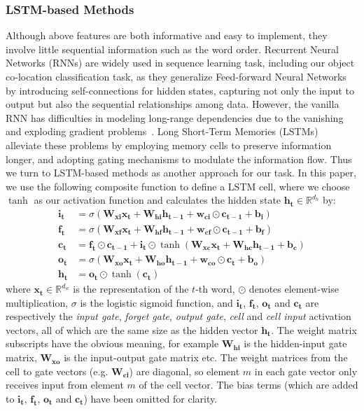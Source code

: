 \subsubsection{LSTM-based Methods}
Although above features are both informative and easy to implement, they involve little sequential information such as the word order.
Recurrent Neural Networks (RNNs) are widely used in sequence learning task, 
including our object co-location classification task, 
as they generalize Feed-forward Neural Networks by 
introducing self-connections for hidden states, 
capturing not only the input to output but also the sequential 
relationships among data.
However, the vanilla RNN has difficulties in modeling long-range 
dependencies due to the vanishing and exploding gradient 
problems~\cite{bengio1994learning}.
Long Short-Term Memories (LSTMs) ~\cite{hochreiter1997long} 
alleviate these problems by employing memory cells to preserve information 
longer, and adopting gating mechanisms to modulate the 
information flow. Thus we turn to LSTM-based methods as 
another approach for our task. In this paper, we use the 
following composite function to define a LSTM cell, 
where we choose $\tanh$ as our activation function and calculates the hidden state $\mathbf{h_t} \in \mathbb{R}^{d_h}$ by:
\begin{equation*}
	\begin{split}\mathbf{i_t} &= \sigma(\mathbf{W_{xi} x_t + W_{hi} h_{t-1}
	+ w_{ci} \odot c_{t-1} + b_i})\\
	\mathbf{f_t} &= \sigma(\mathbf{W_{xf} x_t + W_{hf} h_{t-1}
	+ w_{cf} \odot c_{t-1} + b_f})\\
	\mathbf{c_t} &= \mathbf{f_t \odot c_{t - 1}}
	+ \mathbf{i_t} \odot \tanh(\mathbf{W_{xc} x_t + W_{hc} h_{t-1} + b_c})\\
	\mathbf{o_t} &= \sigma(\mathbf{W_{xo} x_t + W_{ho} h_{t-1} + w_{co} \odot c_t + b_o})\\
	\mathbf{h_t} &= \mathbf{o_t} \odot \tanh(\mathbf{c_t})\end{split}
\end{equation*}
where $\mathbf{x_t} \in \mathbb{R}^{d_w}$ is the representation of the $t$-th word, $\odot$ denotes element-wise multiplication, $\sigma$ is the logistic sigmoid function, and $\mathbf{i_t}$, $\mathbf{f_t}$, $\mathbf{o_t}$ and $\mathbf{c_t}$ are respectively the
\textit{input gate}, \textit{forget gate}, \textit{output gate}, \textit{cell} and \textit{cell input} activation vectors, all of which are the same size as the hidden vector $\mathbf{h_t}$. The weight matrix subscripts have the obvious meaning, for example $\mathbf{W_{hi}}$ is the hidden-input gate matrix, $\mathbf{W_{xo}}$ is the input-output gate matrix etc. The weight matrices from the cell
to gate vectors (e.g. $\mathbf{W_{ci}}$) are diagonal, so element $m$ in each gate vector only
receives input from element $m$ of the cell vector. The bias terms (which are
added to $\mathbf{i_t}$, $\mathbf{f_t}$, $\mathbf{o_t}$ and $\mathbf{c_t}$) have been omitted for clarity.

